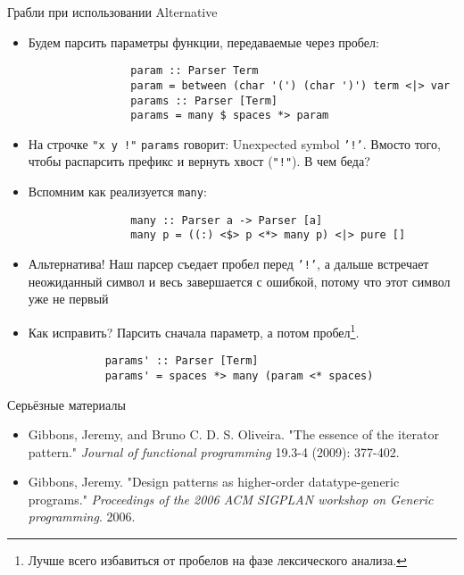     \begin{frame}[fragile]{Грабли при использовании Alternative}
        \vspace{-0.5em}
        \begin{itemize}
            \item Будем парсить параметры функции, передаваемые через пробел:
            \begin{verbatim}
                param :: Parser Term
                param = between (char '(') (char ')') term <|> var
                params :: Parser [Term]
                params = many $ spaces *> param
            \end{verbatim}
            \item На строчке \texttt{"x y !"} \texttt{params} говорит: Unexpected symbol \texttt{'!'}. Вмосто того, чтобы распарсить префикс и вернуть хвост (\texttt{"!"}). В чем беда?
            \item Вспомним как реализуется \texttt{many}:
            \begin{verbatim}
                many :: Parser a -> Parser [a]
                many p = ((:) <$> p <*> many p) <|> pure []
            \end{verbatim}
            \item Альтернатива! Наш парсер съедает пробел перед \texttt{'!'}, а дальше встречает неожиданный символ и весь завершается с ошибкой, потому что этот символ уже не первый
            \item Как исправить? \pause Парсить сначала параметр, а потом пробел\footnote{Лучше всего избавиться от пробелов на фазе лексического анализа.}.
            \begin{verbatim}
            params' :: Parser [Term]
            params' = spaces *> many (param <* spaces)
            \end{verbatim}
        \end{itemize}
    \end{frame}


    \begin{frame}[fragile]{Серьёзные материалы}
        \begin{itemize}
            \item Gibbons, Jeremy, and Bruno C. D. S. Oliveira. "The essence of the iterator pattern." \textit{Journal of functional programming} 19.3-4 (2009): 377-402.
            \item Gibbons, Jeremy. "Design patterns as higher-order datatype-generic programs." \textit{Proceedings of the 2006 ACM SIGPLAN workshop on Generic programming}. 2006.
        \end{itemize}
    \end{frame}


